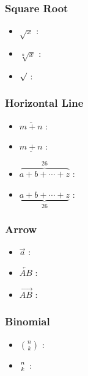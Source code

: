 \documentclass{article}
\begin{document}
\subsubsection{Square Root}
\begin{itemize}
    \item $\sqrt x$ : 
    \item $\sqrt[n] x$ : 
    \item $\surd$ : 
\end{itemize}

\subsubsection{Horizontal Line}
\begin{itemize}
    \item $\overline{m+n}$ : 
    \item $\underline{m+n}$ : 
    \item $\overbrace{a+b+\cdots+z}^{26}$ : 
    \item $\underbrace{a+b+\cdots+z}_{26}$ : 
\end{itemize}

\subsubsection{Arrow} 
\begin{itemize}
    \item $\vec a$ : 
    \item $\overleftarrow{AB}$ : 
    \item $\overrightarrow{AB}$ : 
\end{itemize}

\subsubsection{Binomial}
\begin{itemize}
    \item ${n \choose k}$ : 
    \item ${n \atop k}$ : 
\end{itemize}
\end{document}
